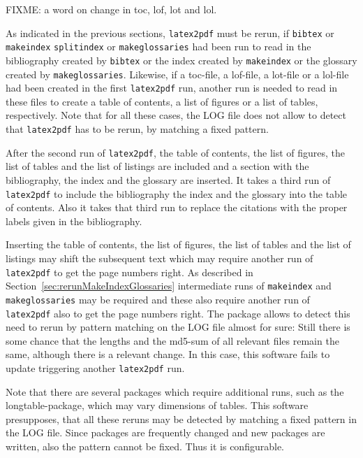 FIXME\@: a word on change in toc, lof, lot and lol. 

As indicated in the previous sections, 
\texttt{latex2pdf} must be rerun, 
if \texttt{bibtex} or \texttt{makeindex} \texttt{splitindex} 
or \texttt{makeglossaries} 
had been run 
to read in the bibliography created by \texttt{bibtex} 
or the index created by \texttt{makeindex} 
or the glossary created by \texttt{makeglossaries}. 
Likewise, if a toc-file, a lof-file, a lot-file or a lol-file
had been created in the first \texttt{latex2pdf} run, 
another run is needed to read in these files 
to create a table of contents, a list of figures or a list of tables, 
respectively. 
Note that for all these cases, 
the LOG file does not allow to detect that \texttt{latex2pdf} has to be rerun, 
by matching a fixed pattern. 

After the second run of \texttt{latex2pdf}, 
the table of contents,
the list of figures, the list of tables and the list of listings 
are included and a section with the bibliography, 
the index and the glossary are inserted. 
It takes a third run of \texttt{latex2pdf} 
to include the bibliography the index and the glossary 
into the table of contents. 
Also it takes that third run to replace the citations 
with the proper labels given in the bibliography. 

Inserting the table of contents,
the list of figures, the list of tables and the list of listings 
may shift the subsequent text 
which may require another run of \texttt{latex2pdf} 
to get the page numbers right. 
As described in Section~\ref{sec:rerunMakeIndexGlossaries} 
intermediate runs of \texttt{makeindex} and \texttt{makeglossaries} 
may be required 
and these also require another run of \texttt{latex2pdf} 
also to get the page numbers right. 
The package  allows to detect this need to rerun 
by pattern matching on the LOG file almost for sure: 
Still there is some chance 
that the lengths and the md5-sum of all relevant files 
remain the same, although there is a relevant change. 
In this case, this software fails to update 
triggering another \texttt{latex2pdf} run. 


Note that there are several packages which require additional runs, 
such as the longtable-package, 
which may vary dimensions of tables. 
This software presupposes, that all these reruns 
may be detected by matching a fixed pattern in the LOG file. 
Since packages are frequently changed and new packages are written, 
also the pattern cannot be fixed. 
Thus it is configurable. 
 

